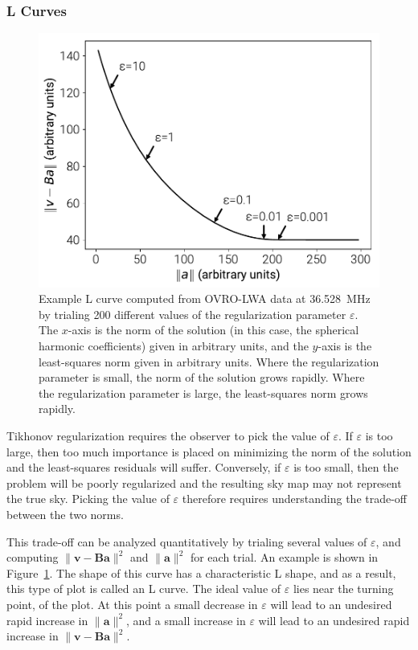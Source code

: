\documentclass[twocolumn]{aastex61}
\renewcommand{\b}{\pmb}
\begin{document}
\subsubsection{L Curves}

\begin{figure}[t]
    \includegraphics[width=\columnwidth]{figures/lcurve/lcurve}
    \caption{
        Example L curve computed from OVRO-LWA data at 36.528~MHz by trialing 200 different values
        of the regularization parameter $\varepsilon$. The $x$-axis is the norm of the solution (in
        this case, the spherical harmonic coefficients) given in arbitrary units, and the $y$-axis
        is the least-squares norm given in arbitrary units. Where the regularization parameter is
        small, the norm of the solution grows rapidly. Where the regularization parameter is large,
        the least-squares norm grows rapidly.
    }
    \label{fig:lcurve}
\end{figure}

Tikhonov regularization requires the observer to pick the value of $\varepsilon$. If $\varepsilon$
is too large, then too much importance is placed on minimizing the norm of the solution and the
least-squares residuals will suffer. Conversely, if $\varepsilon$ is too small, then the problem
will be poorly regularized and the resulting sky map may not represent the true sky. Picking the
value of $\varepsilon$ therefore requires understanding the trade-off between the two norms.

This trade-off can be analyzed quantitatively by trialing several values of $\varepsilon$, and
computing $\|\b v - \b B\b a\|^2$ and $\|\b a\|^2$ for each trial. An example is shown in
Figure~\ref{fig:lcurve}. The shape of this curve has a characteristic L shape, and as a result, this
type of plot is called an L curve. The ideal value of $\varepsilon$ lies near the turning point, of
the plot. At this point a small decrease in $\varepsilon$ will lead to an undesired rapid increase
in $\|\b a\|^2$, and a small increase in $\varepsilon$ will lead to an undesired rapid increase in
$\|\b v - \b B\b a\|^2$.
\end{document}
